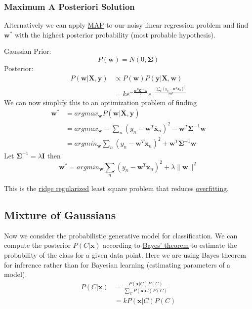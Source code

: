\documentclass[12pt]{article}
\begin{document}
        \subsubsection{Maximum A Posteriori Solution}
            Alternatively we can apply \hyperref[sec:MAP]{MAP} to our noisy linear regression problem and find
            $\boldsymbol{w}^*$ with the highest posterior probability (most probable hypothesis).
            
            Gaussian Prior:
            $$ P(\boldsymbol{w}) = N(0, \boldsymbol{\Sigma}) $$ Posterior:
            \begin{align*}
                P(\boldsymbol{w} | \boldsymbol{X}, \boldsymbol{y}) &\propto P(\boldsymbol{w})P(\boldsymbol{y}|\boldsymbol{X}, \boldsymbol{w}) \\
                &= ke^{-\frac{\boldsymbol{w}^T\boldsymbol{\Sigma}^{-1}\boldsymbol{w}}{2}} e^{-\frac{\sum_n(y_n - \boldsymbol{w}^T\boldsymbol{x}_n)^2}{2\sigma^2}}
            \end{align*}
            We can now simplify this to an optimization problem of finding
            \begin{align*}
                \boldsymbol{w}^* &= argmax_{\boldsymbol{w}}P(\boldsymbol{w}|\overline{\boldsymbol{X}}, \boldsymbol{y}) \\
                &= argmax_{\boldsymbol{w}} - \sum_{n} (y_n - \boldsymbol{w}^T\overline{\boldsymbol{x}}_n)^2 - \boldsymbol{w}^T \boldsymbol{\Sigma}^{-1}\boldsymbol{w} \\
                &= argmin_{\boldsymbol{w}} \sum_{n} (y_n - \boldsymbol{w}^T \overline{\boldsymbol{x}}_n)^2 + \boldsymbol{w}^T \boldsymbol{\Sigma}^{-1}\boldsymbol{w}
            \end{align*}
            Let $\boldsymbol{\Sigma}^{-1} = \lambda \boldsymbol{I}$ then
            $$ \boldsymbol{w}^* = argmin_{\boldsymbol{w}} \sum_{n} (y_n - \boldsymbol{w}^T
            \overline{\boldsymbol{x}}_n)^2 + \lambda \|\boldsymbol{w}\|^2 $$

            This is the \hyperref[sec:RidgeReg]{ridge regularized} least square problem that reduces
            \hyperref[sec:Overfitting]{overfitting}.

    \subsection{Mixture of Gaussians}
        Now we consider the probabilistic generative model \label{fact:GenerativeModel} for classification. We can
        compute the posterior $P(C|\boldsymbol{x})$ according to \hyperref[fact:Bayes]{Bayes' theorem} to estimate the
        probability of the class for a given data point. Here we are using Bayes theorem for inference rather than for
        Bayesian learning (estimating parameters of a model).
        \begin{align*}
            P(C|\boldsymbol{x}) &= \frac{P(\boldsymbol{x}|C)P(C)}{\sum_C P(\boldsymbol{x}|C)P(C)} \\
            &= k P(\boldsymbol{x}|C)P(C)
        \end{align*}
\end{document}
